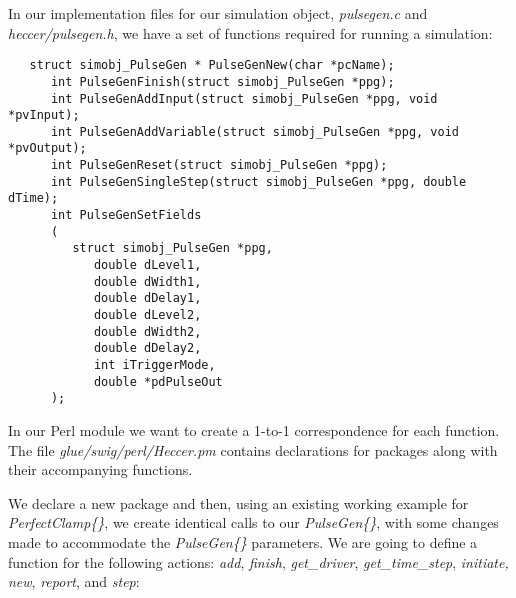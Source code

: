 \documentclass[12pt]{article}
\begin{document}
In our implementation files for our simulation object, {\it pulsegen.c} and {\it heccer/pulsegen.h}, we have a set of functions required for running a simulation:
\begin{verbatim}
   struct simobj_PulseGen * PulseGenNew(char *pcName);
      int PulseGenFinish(struct simobj_PulseGen *ppg);
      int PulseGenAddInput(struct simobj_PulseGen *ppg, void *pvInput);
      int PulseGenAddVariable(struct simobj_PulseGen *ppg, void *pvOutput);
      int PulseGenReset(struct simobj_PulseGen *ppg);
      int PulseGenSingleStep(struct simobj_PulseGen *ppg, double dTime);
      int PulseGenSetFields
      (
         struct simobj_PulseGen *ppg,
            double dLevel1,
            double dWidth1,
            double dDelay1,
            double dLevel2,
            double dWidth2,
            double dDelay2,
            int iTriggerMode,
            double *pdPulseOut
      );
\end{verbatim}
In our Perl module we want to create a 1-to-1 correspondence for each function. The file {\it glue/swig/perl/Heccer.pm} contains declarations for packages along with their accompanying functions.

We declare a new package and then, using an existing working example for {\it PerfectClamp\{\}}, we create identical calls to our {\it PulseGen\{\}}, with some changes made to accommodate the {\it PulseGen\{\}} parameters. We are going to define a function for the following actions: {\it add}, {\it finish}, {\it get\_driver}, {\it get\_time\_step}, {\it initiate, new}, {\it report}, and {\it step}:
\end{document}
